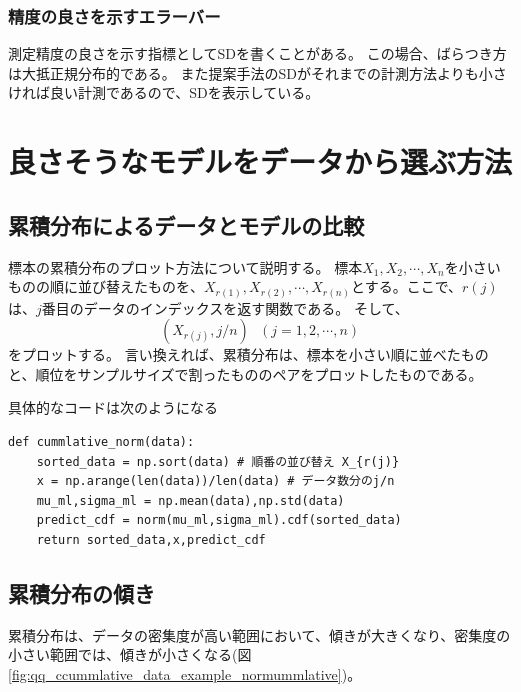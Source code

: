 \subsubsection{精度の良さを示すエラーバー}
測定精度の良さを示す指標としてSDを書くことがある。
この場合、ばらつき方は大抵正規分布的である。
また提案手法のSDがそれまでの計測方法よりも小さければ良い計測であるので、SDを表示している。




\section{良さそうなモデルをデータから選ぶ方法}



\subsection{累積分布によるデータとモデルの比較}

標本の累積分布のプロット方法について説明する。
標本$X_1,X_2,\cdots,X_n$を小さいものの順に並び替えたものを、$X_{r(1)},X_{r(2)},\cdots,X_{r(n)}$とする。ここで、$r(j)$は、$j$番目のデータのインデックスを返す関数である。
そして、
\begin{equation*}
    (X_{r(j)},j/n) \ \ \ (j=1,2,\cdots,n)
\end{equation*}
をプロットする。
言い換えれば、累積分布は、標本を小さい順に並べたものと、順位をサンプルサイズで割ったもののペアをプロットしたものである。

具体的なコードは次のようになる
\begin{lstlisting}
def cummlative_norm(data):
    sorted_data = np.sort(data) # 順番の並び替え X_{r(j)}
    x = np.arange(len(data))/len(data) # データ数分のj/n 
    mu_ml,sigma_ml = np.mean(data),np.std(data)
    predict_cdf = norm(mu_ml,sigma_ml).cdf(sorted_data)
    return sorted_data,x,predict_cdf
\end{lstlisting}

\subsection{累積分布の傾き}
累積分布は、データの密集度が高い範囲において、傾きが大きくなり、密集度の小さい範囲では、傾きが小さくなる(図\ref{fig:qq_ccummlative_data_example_normummlative})。


